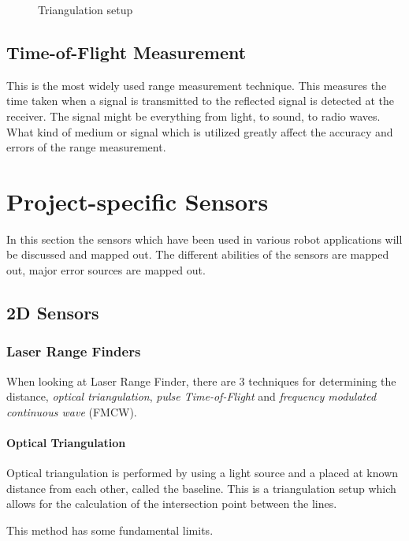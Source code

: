 \begin{figure}[htbp]
    \caption{Triangulation setup}
    \label{fig:triangulation}
\end{figure}


\subsection{Time-of-Flight Measurement}
This is the most widely used range measurement technique. This measures the time taken
when a signal is transmitted to the reflected signal is detected at the receiver. The
signal might be everything from light, to sound, to radio waves. What kind of medium or
signal which is utilized greatly affect the accuracy and errors of the range measurement. 




\section{Project-specific Sensors}
In this section the sensors which have been used in various robot applications will be
discussed and mapped out. The different abilities of the sensors are mapped out, major
error sources are mapped out.


\subsection{2D Sensors}

\subsubsection{Laser Range Finders}


When looking at Laser Range Finder, there are 3 techniques for determining the distance,
\emph{optical triangulation}, \emph{pulse Time-of-Flight} and \emph{frequency modulated
continuous wave} (FMCW). \cite{laser-ranging-critical-review}

\paragraph{Optical Triangulation}
Optical triangulation is performed by using a light source and a placed at known distance
from each other, called the baseline. This is a triangulation setup which
allows for the calculation of the intersection point between the lines. 



This method has some fundamental limits. \cite{laser-ranging-critical-review} 

